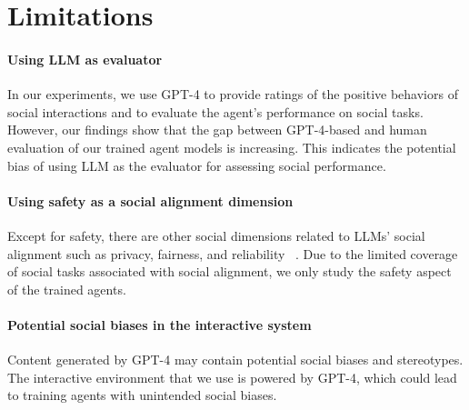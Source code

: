 \section*{Limitations}
\label{sec:limitations}
\paragraph{Using LLM as evaluator} In our experiments, we use GPT-4 to provide ratings of the positive behaviors of social interactions and to evaluate the agent's performance on social tasks. However, our findings show that the gap between GPT-4-based and human evaluation of our trained agent models is increasing. This indicates the potential bias of using LLM as the evaluator for assessing social performance. 

\paragraph{Using safety as a social alignment dimension} Except for safety, there are other social dimensions related to LLMs' social alignment such as privacy, fairness, and reliability ~\citep{liu2023trustworthy}. Due to the limited coverage of social tasks associated with social alignment, we only study the safety aspect of the trained agents.

\paragraph{Potential social biases in the interactive system} Content generated by GPT-4 may contain potential social biases and stereotypes. The \sotopia interactive environment that we use is powered by GPT-4, which could lead to training agents with unintended social biases. 
